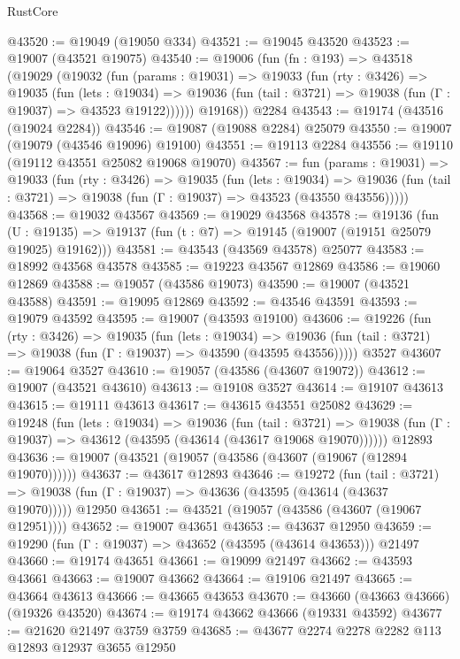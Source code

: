 \begin{lexlean}{RustCore}
\begin{coremodule}
@43520 := @19049 (@19050 @334)
@43521 := @19045 @43520
@43523 := @19007 (@43521 @19075)
@43540 := @19006
    (fun (fn : @193) =>
    @43518
      (@19029
        (@19032
          (fun (params : @19031) =>
          @19033
            (fun (rty : @3426) =>
            @19035
              (fun (lets : @19034) =>
              @19036 (fun (tail : @3721) => @19038 (fun (Γ : @19037) => @43523 @19122))))))
        @19168))
    @2284
@43543 := @19174 (@43516 (@19024 @2284))
@43546 := @19087 (@19088 @2284) @25079
@43550 := @19007 (@19079 (@43546 @19096) @19100)
@43551 := @19113 @2284
@43556 := @19110 (@19112 @43551 @25082 @19068 @19070)
@43567 := fun (params : @19031) =>
  @19033
    (fun (rty : @3426) =>
    @19035
      (fun (lets : @19034) =>
      @19036 (fun (tail : @3721) => @19038 (fun (Γ : @19037) => @43523 (@43550 @43556)))))
@43568 := @19032 @43567
@43569 := @19029 @43568
@43578 := @19136
    (fun (U : @19135) => @19137 (fun (t : @7) => @19145 (@19007 (@19151 @25079 @19025) @19162)))
@43581 := @43543 (@43569 @43578) @25077
@43583 := @18992 @43568 @43578
@43585 := @19223 @43567 @12869
@43586 := @19060 @12869
@43588 := @19057 (@43586 @19073)
@43590 := @19007 (@43521 @43588)
@43591 := @19095 @12869
@43592 := @43546 @43591
@43593 := @19079 @43592
@43595 := @19007 (@43593 @19100)
@43606 := @19226
    (fun (rty : @3426) =>
    @19035
      (fun (lets : @19034) =>
      @19036 (fun (tail : @3721) => @19038 (fun (Γ : @19037) => @43590 (@43595 @43556)))))
    @3527
@43607 := @19064 @3527
@43610 := @19057 (@43586 (@43607 @19072))
@43612 := @19007 (@43521 @43610)
@43613 := @19108 @3527
@43614 := @19107 @43613
@43615 := @19111 @43613
@43617 := @43615 @43551 @25082
@43629 := @19248
    (fun (lets : @19034) =>
    @19036
      (fun (tail : @3721) =>
      @19038 (fun (Γ : @19037) => @43612 (@43595 (@43614 (@43617 @19068 @19070))))))
    @12893
@43636 := @19007 (@43521 (@19057 (@43586 (@43607 (@19067 (@12894 @19070))))))
@43637 := @43617 @12893
@43646 := @19272
    (fun (tail : @3721) => @19038 (fun (Γ : @19037) => @43636 (@43595 (@43614 (@43637 @19070)))))
    @12950
@43651 := @43521 (@19057 (@43586 (@43607 (@19067 @12951))))
@43652 := @19007 @43651
@43653 := @43637 @12950
@43659 := @19290 (fun (Γ : @19037) => @43652 (@43595 (@43614 @43653))) @21497
@43660 := @19174 @43651
@43661 := @19099 @21497
@43662 := @43593 @43661
@43663 := @19007 @43662
@43664 := @19106 @21497
@43665 := @43664 @43613
@43666 := @43665 @43653
@43670 := @43660 (@43663 @43666) (@19326 @43520)
@43674 := @19174 @43662 @43666 (@19331 @43592)
@43677 := @21620 @21497 @3759 @3759
@43685 := @43677 @2274 @2278 @2282 @113 @12893 @12937 @3655 @12950

\end{coremodule}
\end{lexlean}
